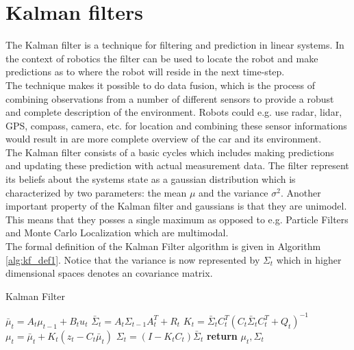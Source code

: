 
\section{Kalman filters}

The Kalman filter is a technique for filtering and prediction in linear systems. In the context of robotics the filter can be used to locate the robot and make predictions as to where the robot will reside in the next time-step.\\

The technique makes it possible to do data fusion, which is the process of combining observations from a number of different sensors to provide a robust and complete description of the environment. Robots could e.g. use radar, lidar, GPS, compass, camera, etc. for location and combining these sensor informations would result in are more complete overview of the car and its environment.\\

The Kalman filter consists of a basic cycles which includes making predictions and updating these prediction with actual measurement data. The filter represent its beliefs about the systems state as a gaussian distribution which is characterized by two parameters: the mean $\mu$ and the variance $\sigma^2$. Another important property of the Kalman filter and gaussians is that they are unimodel. This means that they posses a single maximum as opposed to e.g. Particle Filters and Monte Carlo Localization which are multimodal.\\

The formal definition of the Kalman Filter algorithm is given in Algorithm \ref{alg:kf_def1}. Notice that the variance is now represented by $\Sigma_{t}$ which in higher dimensional spaces denotes an covariance matrix.

\begin{center}
\begin{minipage}{.65\linewidth}
\begin{algorithm}[H]
\caption{Kalman Filter}
\label{alg:kf_def1}
\begin{algorithmic}[1]
  \State $\bar\mu_{t} = A_{t}\mu_{t-1} + B_{t}u_{t}$%
  \State $\bar\Sigma_{t} = A_{t}\Sigma_{t-1}A_{t}^T + R_{t}$
  \State $K_{t} = \bar\Sigma_{t}C_{t}^T(C_{t}\bar{\Sigma}_{t}C_{t}^T+Q_{t})^{-1}$
  \State $\mu_{t} = \bar\mu_{t} + K_{t}(z_{t} - C_{t}\bar\mu_{t})$
  \State $\Sigma_{t} = (I - K_{t}C_{t})\bar\Sigma_{t}$
  \State \textbf{return} $\mu_{t}, \Sigma_{t}$
\EndProcedure
\end{algorithmic}
\end{algorithm}
\end{minipage}
\end{center}

